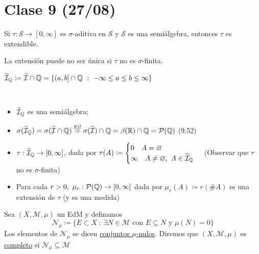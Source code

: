 \section{Clase 9 (27/08)}

\begin{remark}
	Si $\tau : \mathscr{S} \to [0,\infty]$ es $\sigma$-aditiva en $\mathscr{S}$ y $\mathscr{S}$ es una semiálgebra, entonces $\tau$ es extendible.
\end{remark}

\begin{remark}
	La extensión puede no ser única si $\tau$ no es $\sigma$-finita.
\end{remark}
\begin{eg}
	$\widetilde{\mathcal{I}}_{\mathbb{Q}} \coloneq \widetilde{\mathcal{I}} \cap \mathbb{Q} = \{ (a,b] \cap \mathbb{Q} \ : \ -\infty \leq a \leq b \leq \infty \}$ 
\end{eg}

\begin{note}~
	\begin{itemize}
		\item $\widetilde{\mathcal{I}}_{\mathbb{Q}}$ es una semiálgebra;

		\item $\sigma (\widetilde{\mathcal{I}}_{\mathbb{Q}}) = \sigma (\widetilde{\mathcal{I}} \cap \mathbb{Q}) \stackrel{\text{Ej!}}{=} \sigma (\widetilde{\mathcal{I}}) \cap \mathbb{Q} = \beta(\mathbb{R}) \cap \mathbb{Q} = \mathcal{P}(\mathbb{Q})$ (9.52)

	\item $\tau : \widetilde{\mathcal{I}}_{\mathbb{Q}} \to [0,\infty]$, dada por $\tau(A) \coloneq \begin{cases}
			0 \quad A = \varnothing \\
			\infty \quad A \neq \varnothing,\ A \in \widetilde{\mathcal{I}}_{\mathbb{Q}}
		\end{cases}$ (Observar que $\tau$ no es $\sigma$-finita)

		\item Para cada $r > 0,\ \mu_r : \mathcal{P}(\mathbb{Q}) \to [0,\infty]$ dada por $\mu_r(A) \coloneq r(\# A)$ es una extensión de $\tau$ (y es una medida)
	\end{itemize}
\end{note}

\begin{definition}
	Sea $(X,\mathscr{M},\mu)$ un EdM y definamos 
	\[ \mathscr{N}_{\mu} \coloneq \{ E \subset X \ : \ \exists N \in \mathscr{M} \text{ con } E \subseteq N \text{ y } \mu(N) = 0 \} \] 
	Los elementos de $\mathscr{N}_{\mu}$ se dicen \underline{conjuntos $\mu$-nulos}. Diremos que $(X,\mathscr{M},\mu)$ es \underline{completo} si $\mathscr{N}_{\mu} \subseteq \mathscr{M}$
\end{definition}

